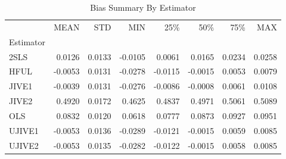 \begin{table}[ht]
\centering
\caption{Bias Summary By Estimator}
\begin{tabular}{lrrrrrrr}
\toprule
 & MEAN & STD & MIN & 25\% & 50\% & 75\% & MAX \\
Estimator &  &  &  &  &  &  &  \\
\midrule
2SLS & 0.0126 & 0.0133 & -0.0105 & 0.0061 & 0.0165 & 0.0234 & 0.0258 \\
HFUL & -0.0053 & 0.0131 & -0.0278 & -0.0115 & -0.0015 & 0.0053 & 0.0079 \\
JIVE1 & -0.0039 & 0.0131 & -0.0276 & -0.0086 & -0.0008 & 0.0061 & 0.0108 \\
JIVE2 & 0.4920 & 0.0172 & 0.4625 & 0.4837 & 0.4971 & 0.5061 & 0.5089 \\
OLS & 0.0832 & 0.0120 & 0.0618 & 0.0777 & 0.0873 & 0.0927 & 0.0951 \\
UJIVE1 & -0.0053 & 0.0136 & -0.0289 & -0.0121 & -0.0015 & 0.0059 & 0.0085 \\
UJIVE2 & -0.0053 & 0.0135 & -0.0282 & -0.0122 & -0.0015 & 0.0058 & 0.0085 \\
\bottomrule
\end{tabular}
\end{table}
